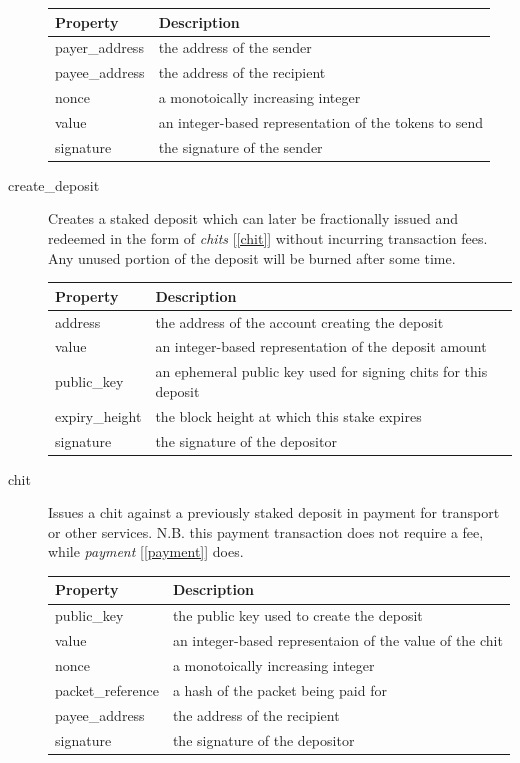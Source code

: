 \documentclass[UTF8, 10pt, nonatbib, nocopyrightspace, reprint]{sigplanconf}
\newcommand{\secref}[1]{[\autoref{#1}]}
\begin{document}
\begin{description}
\begin{table}[H]
  \centering
  \begin{tabularx}{\columnwidth}{l X}
      \toprule
      Property & Description \\ \midrule
      payer\_address & the address of the sender \\
      payee\_address & the address of the recipient \\
      nonce & a monotoically increasing integer \\
      value & an integer-based representation of the tokens to send \\
      signature & the signature of the sender
  \end{tabularx}
\end{table}

\item [create\_deposit] Creates a staked deposit which can later be fractionally issued and redeemed in the form of \emph{chits} \secref{chit} without incurring transaction fees. Any unused portion of the deposit will be burned after some time.

\begin{table}[H]
  \centering
  \begin{tabularx}{\columnwidth}{l X}
      \toprule
      Property & Description \\ \midrule
      address & the address of the account creating the deposit \\
      value & an integer-based representation of the deposit amount \\
      public\_key & an ephemeral public key used for signing chits for this deposit \\
      expiry\_height & the block height at which this stake expires \\
      signature & the signature of the depositor
  \end{tabularx}
\end{table}

\item [chit] \label{chit} Issues a chit against a previously staked deposit in payment for transport or other services. N.B. this payment transaction does not require a fee, while \emph{payment} \secref{payment} does.

\begin{table}[H]
  \centering
  \begin{tabularx}{\columnwidth}{l X}
      \toprule
      Property & Description \\ \midrule
      public\_key & the public key used to create the deposit \\
      value & an integer-based representaion of the value of the chit \\
      nonce & a monotoically increasing integer \\
      packet\_reference & a hash of the packet being paid for \\
      payee\_address & the address of the recipient \\
      signature & the signature of the depositor
  \end{tabularx}
\end{table}


\end{description}
\end{document}
